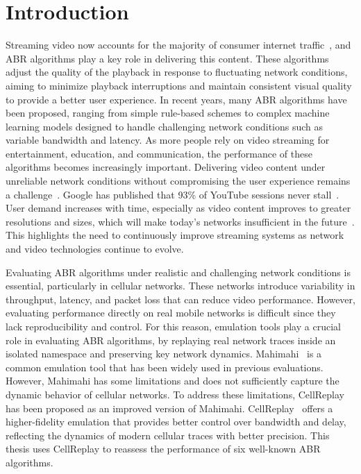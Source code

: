 \section{Introduction}\label{s:intro}

Streaming video now accounts for the majority of consumer internet traffic~\cite{wikipediaInternetTraffic}, and ABR algorithms play a key role in delivering this content. These algorithms adjust the quality of the playback in response to fluctuating network conditions, aiming to minimize playback interruptions and maintain consistent visual quality to provide a better user experience. In recent years, many ABR algorithms have been proposed, ranging from simple rule-based schemes to complex machine learning models designed to handle challenging network conditions such as variable bandwidth and latency. As more people rely on video streaming for entertainment, education, and communication, the performance of these algorithms becomes increasingly important. Delivering video content under unreliable network conditions without compromising the user experience remains a challenge~\cite{voxel-conext21}. Google has published that 93\% of YouTube sessions never stall~\cite{quic-sigcomm17}. User demand increases with time, especially as video content improves to greater resolutions and sizes, which will make today's networks insufficient in the future~\cite{puffer-faq}. This highlights the need to continuously improve streaming systems as network and video technologies continue to evolve.

Evaluating ABR algorithms under realistic and challenging network conditions is essential, particularly in cellular networks. These networks introduce variability in throughput, latency, and packet loss that can reduce video performance. However, evaluating performance directly on real mobile networks is difficult since they lack reproducibility and control. For this reason, emulation tools play a crucial role in evaluating ABR algorithms, by replaying real network traces inside an isolated namespace and preserving key network dynamics. Mahimahi~\cite{mahimahi} is a common emulation tool that has been widely used in previous evaluations. However, Mahimahi has some limitations and does not sufficiently capture the dynamic behavior of cellular networks. To address these limitations, CellReplay has been proposed as an improved version of Mahimahi. CellReplay~\cite{cellreplay-nsdi25} offers a higher-fidelity emulation that provides better control over bandwidth and delay, reflecting the dynamics of modern cellular traces with better precision. This thesis uses CellReplay to reassess the performance of six well-known ABR algorithms.


